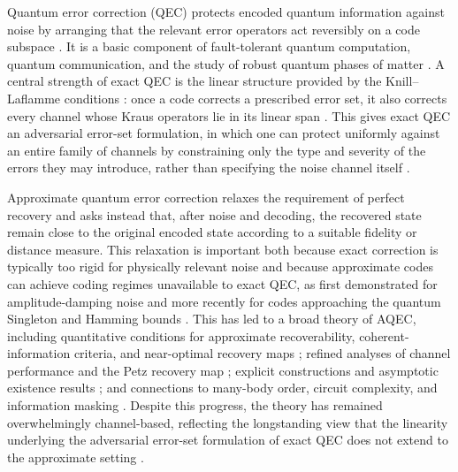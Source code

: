 \documentclass[10pt]{article}
\begin{document}
Quantum error correction (QEC) protects encoded quantum information against noise by arranging that the relevant error operators act reversibly on a code subspace \cite{shor1995scheme,knill1997theory}. It is a basic component of fault-tolerant quantum computation, quantum communication, and the study of robust quantum phases of matter \cite{shor1996fault,aharonov2008fault,bennett1996mixed,kitaev2003fault,dennis2002topological}. A central strength of exact QEC is the linear structure provided by the Knill--Laflamme conditions \cite{knill1997theory}: once a code corrects a prescribed error set, it also corrects every channel whose Kraus operators lie in its linear span \cite{knill2000theory}. This gives exact QEC an adversarial error-set formulation, in which one can protect uniformly against an entire family of channels by constraining only the type and severity of the errors they may introduce, rather than specifying the noise channel itself \cite{gottesman2010introduction}.

Approximate quantum error correction relaxes the requirement of perfect recovery and asks instead that, after noise and decoding, the recovered state remain close to the original encoded state according to a suitable fidelity or distance measure. This relaxation is important both because exact correction is typically too rigid for physically relevant noise and because approximate codes can achieve coding regimes unavailable to exact QEC, as first demonstrated for amplitude-damping noise and more recently for codes approaching the quantum Singleton and Hamming bounds \cite{leung1997approximate,bergamaschi2024approaching,ma2025haar}. This has led to a broad theory of AQEC, including quantitative conditions for approximate recoverability, coherent-information criteria, and near-optimal recovery maps \cite{schumacher1996sending,schumacher2001approximate,barnum2002reversing,beny2010general,klesse2007approximate}; refined analyses of channel performance and the Petz recovery map \cite{ng2010simple,noh2018quantum,zheng2024near,li2025optimality,kim2026optimal}; explicit constructions and asymptotic existence results \cite{bergamaschi2024approaching,ma2025haar,xu2025letting}; and connections to many-body order, circuit complexity, and information masking \cite{yi2024complexity,yi2025lov,li2025random}. Despite this progress, the theory has remained overwhelmingly channel-based, reflecting the longstanding view that the linearity underlying the adversarial error-set formulation of exact QEC does not extend to the approximate setting \cite{crepeau2005approximate}.
\end{document}
